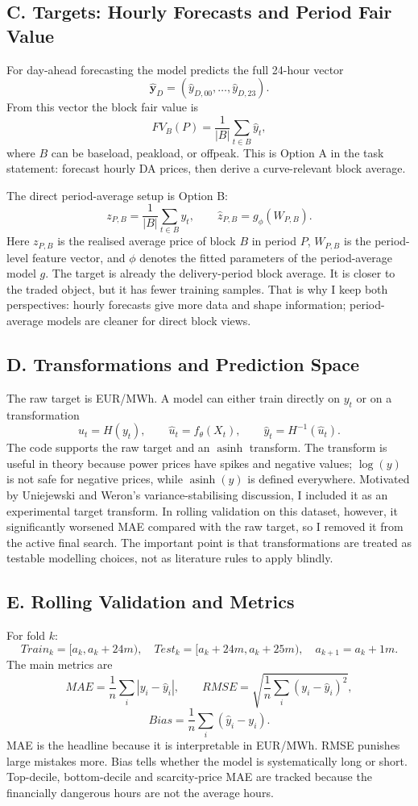 \documentclass[10pt,a4paper]{article}
\begin{document}
\subsection*{C. Targets: Hourly Forecasts and Period Fair Value}
For day-ahead forecasting the model predicts the full 24-hour vector
\[
  \hat{\mathbf{y}}_D=(\hat{y}_{D,00},\ldots,\hat{y}_{D,23}).
\]
From this vector the block fair value is
\[
  FV_B(P)=\frac{1}{|B|}\sum_{t\in B}\hat{y}_t,
\]
where $B$ can be baseload, peakload, or offpeak. This is Option A in the task statement: forecast hourly DA prices, then derive a curve-relevant block average.

The direct period-average setup is Option B:
\[
  z_{P,B}=\frac{1}{|B|}\sum_{t\in B}y_t,
  \qquad
  \hat{z}_{P,B}=g_\phi(W_{P,B}).
\]
Here $z_{P,B}$ is the realised average price of block $B$ in period $P$, $W_{P,B}$ is the period-level feature vector, and $\phi$ denotes the fitted parameters of the period-average model $g$. The target is already the delivery-period block average. It is closer to the traded object, but it has fewer training samples. That is why I keep both perspectives: hourly forecasts give more data and shape information; period-average models are cleaner for direct block views.

\subsection*{D. Transformations and Prediction Space}
The raw target is EUR/MWh. A model can either train directly on $y_t$ or on a transformation
\[
  u_t=H(y_t), \qquad \hat{u}_t=f_\theta(X_t), \qquad \hat{y}_t=H^{-1}(\hat{u}_t).
\]
The code supports the raw target and an $\operatorname{asinh}$ transform. The transform is useful in theory because power prices have spikes and negative values; $\log(y)$ is not safe for negative prices, while $\operatorname{asinh}(y)$ is defined everywhere. Motivated by Uniejewski and Weron's variance-stabilising discussion, I included it as an experimental target transform. In rolling validation on this dataset, however, it significantly worsened MAE compared with the raw target, so I removed it from the active final search. The important point is that transformations are treated as testable modelling choices, not as literature rules to apply blindly.

\subsection*{E. Rolling Validation and Metrics}
For fold $k$:
\[
  Train_k=[a_k,a_k+24m),\quad
  Test_k=[a_k+24m,a_k+25m),\quad
  a_{k+1}=a_k+1m.
\]
The main metrics are
\[
  MAE=\frac{1}{n}\sum_i |y_i-\hat{y}_i|,
  \qquad
  RMSE=\sqrt{\frac{1}{n}\sum_i (y_i-\hat{y}_i)^2},
\]
\[
  Bias=\frac{1}{n}\sum_i(\hat{y}_i-y_i).
\]
MAE is the headline because it is interpretable in EUR/MWh. RMSE punishes large mistakes more. Bias tells whether the model is systematically long or short. Top-decile, bottom-decile and scarcity-price MAE are tracked because the financially dangerous hours are not the average hours.
\end{document}
